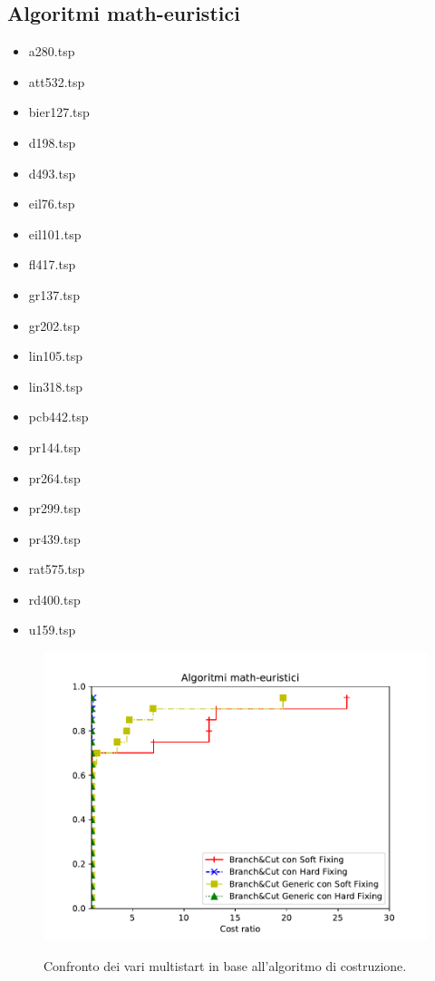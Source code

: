 \subsection{Algoritmi math-euristici}
\begin{center}
\begin{multicols}{3}
\begin{itemize}
\item{a280.tsp}  
\item{att532.tsp} 
\item{bier127.tsp}
\item{d198.tsp}   
\item{d493.tsp}   
\item{eil76.tsp}  
\item{eil101.tsp} 
\item{fl417.tsp}  
\item{gr137.tsp}  
\item{gr202.tsp}  
\item{lin105.tsp} 
\item{lin318.tsp} 
\item{pcb442.tsp} 
\item{pr144.tsp}  
\item{pr264.tsp}  
\item{pr299.tsp}  
\item{pr439.tsp}  
\item{rat575.tsp} 
\item{rd400.tsp}  
\item{u159.tsp}
\end{itemize}
\end{multicols}
\end{center}

\begin{figure}[h] 
\begin{center} 
  \includegraphics[scale=0.8]{Images/pp_math-heuristic}\\ 
  \caption{\footnotesize{Confronto dei vari multistart in base all'algoritmo di costruzione.}}
  \label{perf_profile} 
\end{center} 
\end{figure}

